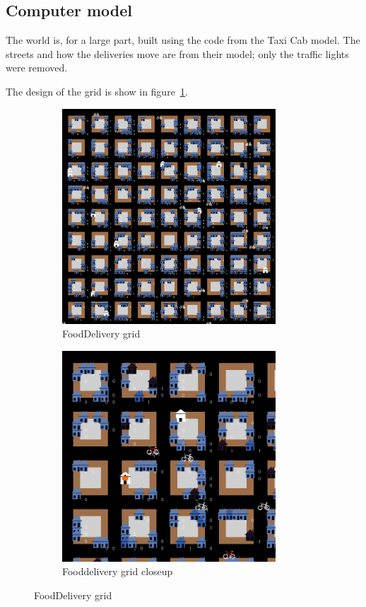 \subsection{Computer model}\label{subsec:computer-model}
The world is, for a large part, built using the code from the Taxi Cab model.
The streets and how the deliveries move are from their model; only the traffic lights were removed.

The design of the grid is show in figure~\ref{fig:grid}.
\begin{center}
\begin{figure}
    \centering
    \begin{subfigure}[m]{0.6\textwidth}
        \centering
        \includegraphics[width=8cm]{sections/pics/grid}
        \caption{FoodDelivery grid}
    \end{subfigure}
    \hfill
    \begin{subfigure}[m]{0.6\textwidth}
        \centering
        \includegraphics[width=8cm]{sections/pics/grid_closeup}
        \caption{Fooddelivery grid closeup}
    \end{subfigure}
    \caption{FoodDelivery grid}
    \label{fig:grid}
\end{figure}

\end{center}
